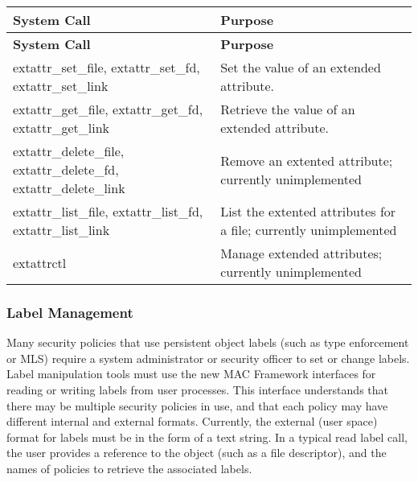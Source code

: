 \begin{longtable}{|p{1.5in}|p{3in}|}
\hline
{\bf System Call} & {\bf Purpose} \\
\hline
\hline
\endfirsthead
\hline
{\bf System Call} & {\bf Purpose} \\
\hline
\hline
\endhead
\hline
\endfoot
extattr\_set\_file, extattr\_set\_fd, extattr\_set\_link & Set the value of an extended attribute. \\[3mm]
\hline
extattr\_get\_file, extattr\_get\_fd, extattr\_get\_link & Retrieve the value of an extended attribute. \\[3mm]
\hline
extattr\_delete\_file, extattr\_delete\_fd, extattr\_delete\_link & Remove an extented attribute; currently unimplemented \\[3mm]
\hline
extattr\_list\_file, extattr\_list\_fd, extattr\_list\_link & List the extented attributes for a file; currently unimplemented \\[3mm]
\hline
extattrctl & Manage extended attributes; currently unimplemented \\
\end{longtable}

\subsubsection{Label Management}
Many security policies that use persistent object labels (such as type
enforcement or MLS) require a system administrator or security officer to
set or change labels. Label manipulation tools must use the new
MAC Framework interfaces for reading or writing
labels from user processes. This interface understands that there may be
multiple security policies in use, and that each policy may have different
internal and external formats. Currently, the external (user space) format
for labels must be in the form of a text string. In a typical read label
call, the user provides a reference to the object (such as a file descriptor),
and the names of policies to retrieve the associated labels.

